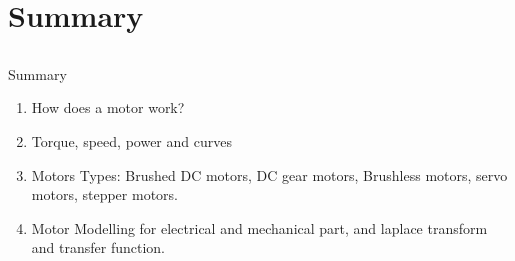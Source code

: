 \section{Summary}


\subsection{}
{
\begin{frame}{Summary}

\begin{enumerate}
\item How does a motor work? 
\item Torque, speed, power and curves
\item Motors Types: Brushed DC motors, DC gear motors, Brushless motors, servo motors, stepper motors.
\item Motor Modelling for electrical and mechanical part, and laplace transform and transfer function.
\end{enumerate}




%

\end{frame}
}



